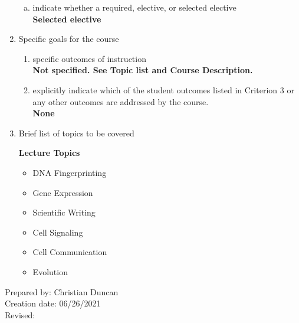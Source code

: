 \begin{enumerate}[1.]
\begin{enumerate}[a.]
\item indicate whether a required, elective, or selected elective\\ %
  {\bfseries
    Selected elective
  }

\end{enumerate}

\item Specific goals for the course
\begin{enumerate}
\item specific outcomes of instruction\\ %
  {\bfseries
    Not specified. See Topic list and Course Description.
  }

\item explicitly indicate which of the student outcomes listed in Criterion 3 or any other outcomes are addressed by the course.\\
  {\bfseries
    None
  }
\end{enumerate}

\item Brief list of topics to be covered\\
  {\bfseries
    Lecture Topics
    \begin{itemize}
      \item DNA Fingerprinting
      \item Gene Expression
      \item Scientific Writing
      \item Cell Signaling
      \item Cell Communication
      \item Evolution
    \end{itemize}
  }

\end{enumerate}

\noindent Prepared by: Christian Duncan\\
\noindent Creation date: 06/26/2021\\
\noindent Revised:\\
